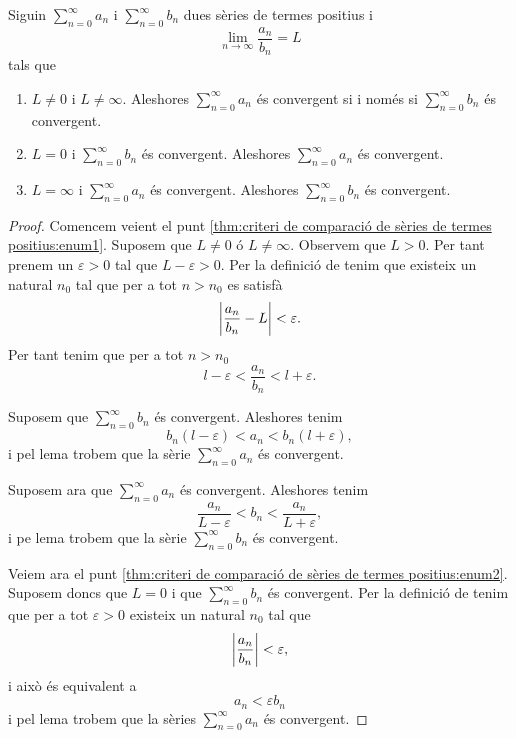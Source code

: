 \documentclass[../../Main.tex]{subfiles}
\begin{document}
	\begin{theorem}
		\label{thm:criteri de comparació de sèries de termes positius}
		Siguin \(\sum_{n=0}^{\infty}a_{n}\) i \(\sum_{n=0}^{\infty}b_{n}\) dues sèries de termes positius i
		\[\lim_{n\to\infty}\frac{a_{n}}{b_{n}}=L\]
		tals que
		\begin{enumerate}
			\item\label{thm:criteri de comparació de sèries de termes positius:enum1} \(L\neq0\) i \(L\neq\infty\). Aleshores \(\sum_{n=0}^{\infty}a_{n}\) és convergent si i només si \(\sum_{n=0}^{\infty}b_{n}\) és convergent.
			\item\label{thm:criteri de comparació de sèries de termes positius:enum2} \(L=0\) i \(\sum_{n=0}^{\infty}b_{n}\) és convergent. Aleshores \(\sum_{n=0}^{\infty}a_{n}\) és convergent.
			\item\label{thm:criteri de comparació de sèries de termes positius:enum3} \(L=\infty\) i \(\sum_{n=0}^{\infty}a_{n}\) és convergent. Aleshores \(\sum_{n=0}^{\infty}b_{n}\) és convergent.
		\end{enumerate}
		\begin{proof}
			Comencem veient el punt \eqref{thm:criteri de comparació de sèries de termes positius:enum1}. Suposem que \(L\neq0\) ó \(L\neq\infty\). Observem que \(L>0\). Per tant prenem un \(\varepsilon>0\) tal que \(L-\varepsilon>0\). Per la definició de  tenim que existeix un natural \(n_{0}\) tal que per a tot \(n>n_{0}\) es satisfà
			\[\abs{\frac{a_{n}}{b_{n}}-L}<\varepsilon.\]
			Per tant tenim que per a tot \(n>n_{0}\)
			\[l-\varepsilon<\frac{a_{n}}{b_{n}}<l+\varepsilon.\]
			
			Suposem que \(\sum_{n=0}^{\infty}b_{n}\) és convergent. Aleshores tenim
			\[b_{n}(l-\varepsilon)<a_{n}<b_{n}(l+\varepsilon),\]
			i pel lema  trobem que la sèrie \(\sum_{n=0}^{\infty}a_{n}\) és convergent.
			
			Suposem ara que \(\sum_{n=0}^{\infty}a_{n}\) és convergent. Aleshores tenim
			\[\frac{a_{n}}{L-\varepsilon}<b_{n}<\frac{a_{n}}{L+\varepsilon},\]
			i pe lema  trobem que la sèrie \(\sum_{n=0}^{\infty}b_{n}\) és convergent.
			
			Veiem ara el punt \eqref{thm:criteri de comparació de sèries de termes positius:enum2}. Suposem doncs que \(L=0\) i que \(\sum_{n=0}^{\infty}b_{n}\) és convergent. Per la definició de  tenim que per a tot \(\varepsilon>0\) existeix un natural \(n_{0}\) tal que
			\[\abs{\frac{a_{n}}{b_{n}}}<\varepsilon,\]
			i això és equivalent a
			\[a_{n}<\varepsilon b_{n}\]
			i pel lema  trobem que la sèries \(\sum_{n=0}^{\infty}a_{n}\) és convergent.
			

\end{proof}
\end{theorem}
\end{document}
